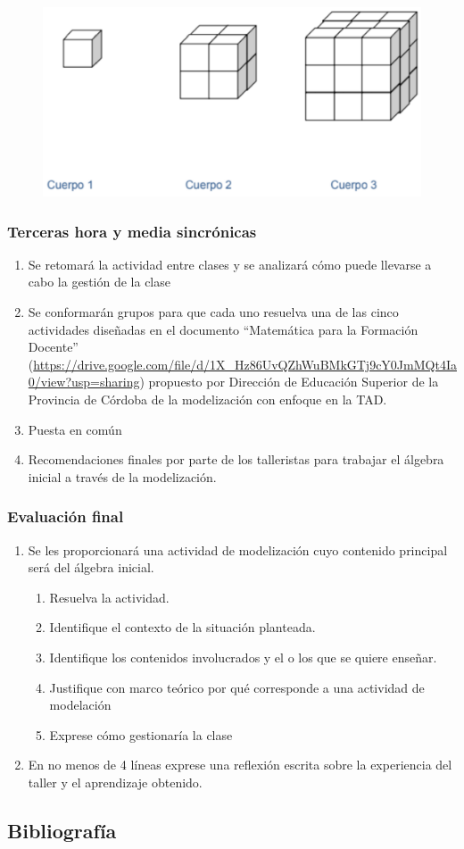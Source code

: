 \begin{center}
	\begin{figure}[h!]
		\centering
		\includegraphics[width=0.7\linewidth]{Trabajos/04/Anexos/grafico_01.png}
		\caption{}
		\label{fig:grafico01}
	\end{figure}
\end{center}

\subsubsection{Terceras hora y media sincrónicas}

\begin{enumerate}
	\item Se retomará la actividad entre clases y se analizará cómo puede llevarse a cabo la gestión de la clase
	\item Se conformarán grupos para que cada uno resuelva una de las cinco actividades diseñadas en el documento “Matemática para la Formación	Docente” (\url{https://drive.google.com/file/d/1X_Hz86UvQZhWuBMkGTj9cY0JmMQt4Ia0/view?usp=sharing}) propuesto por Dirección de Educación Superior de la Provincia de Córdoba de la modelización con enfoque en la TAD.
	\item Puesta en común
	\item Recomendaciones finales por parte de los talleristas para trabajar el álgebra inicial a través de la modelización.
\end{enumerate}

\subsubsection{Evaluación final}

\begin{enumerate}
	\item  Se les proporcionará una actividad de modelización cuyo contenido principal será del álgebra inicial.
	\begin{enumerate}[{1}.1]
		\item Resuelva la actividad.
		\item Identifique el contexto de la situación planteada.
		\item Identifique los contenidos involucrados y el o los que se quiere enseñar.
		\item Justifique con marco teórico por qué corresponde a una actividad de modelación
		\item Exprese cómo gestionaría la clase
	\end{enumerate}
	
	\item En no menos de 4 líneas exprese una reflexión escrita sobre la experiencia del taller y el aprendizaje obtenido.
\end{enumerate}

\subsection{Bibliografía}

\nocite{*}
\printbibliography[keyword={04}]